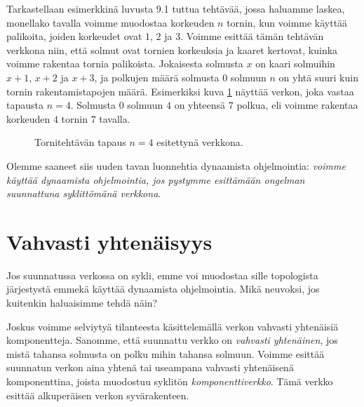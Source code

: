 Tarkastellaan esimerkkinä luvusta 9.1 tuttua tehtävää,
jossa haluamme laskea, monellako tavalla voimme muodostaa
korkeuden $n$ tornin, kun voimme käyttää palikoita,
joiden korkeudet ovat $1$, $2$ ja $3$.
Voimme esittää tämän tehtävän verkkona niin,
että solmut ovat tornien korkeuksia ja kaaret kertovat,
kuinka voimme rakentaa tornia palikoista.
Jokaisesta solmusta $x$ on kaari solmuihin
$x+1$, $x+2$ ja $x+3$,
ja polkujen määrä solmusta $0$ solmuun $n$
on yhtä suuri kuin tornin rakentamistapojen määrä.
Esimerkiksi kuva \ref{fig:verkol} näyttää verkon,
joka vastaa tapausta $n=4$.
Solmusta $0$ solmuun $4$ on yhteensä $7$ polkua,
eli voimme rakentaa korkeuden $4$ tornin $7$ tavalla.

\begin{figure}
\center
\begin{center}
\end{center}
\caption{Tornitehtävän tapaus $n=4$ esitettynä verkkona.}
\label{fig:verkol}
\end{figure}

Olemme saaneet siis uuden tavan luonnehtia dynaamista ohjelmointia:
\emph{voimme käyttää dynaamista ohjelmointia,
jos pystymme esittämään ongelman suunnattuna syklittömänä verkkona}.

\section{Vahvasti yhtenäisyys}

Jos suunnatussa verkossa on sykli,
emme voi muodostaa sille topologista järjestystä
emmekä käyttää dynaamista ohjelmointia.
Mikä neuvoksi, jos kuitenkin haluaisimme tehdä näin?

Joskus voimme selviytyä tilanteesta käsittelemällä
verkon vahvasti yhtenäisiä komponentteja.
Sanomme, että suunnattu verkko on \emph{vahvasti yhtenäinen},
jos mistä tahansa solmusta on polku mihin tahansa solmuun.
Voimme esittää suunnatun verkon aina yhtenä tai
useampana vahvasti yhtenäisenä komponenttina,
joista muodostuu syklitön \emph{komponenttiverkko}.
Tämä verkko esittää alkuperäisen verkon syvärakenteen.

